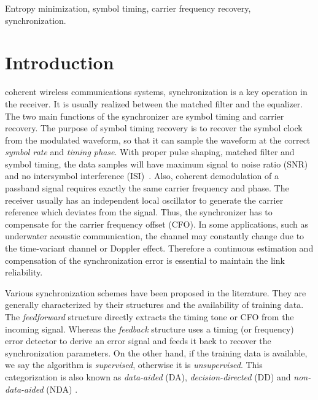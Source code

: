 \documentclass[journal,comsoc]{IEEEtran}
\begin{document}
\begin{IEEEkeywords}
Entropy minimization, symbol timing, carrier frequency recovery, synchronization.
\end{IEEEkeywords}

\IEEEpeerreviewmaketitle

\section{Introduction}
\label{sec:intro}
 coherent wireless communications systems, synchronization is a key operation in the receiver.
It is usually realized between the matched filter and the equalizer.
The two main functions of the synchronizer are symbol timing and carrier recovery.
The purpose of symbol timing recovery is to recover the symbol clock from the modulated waveform, so that it can sample the waveform at the correct \textit{symbol rate} and \textit{timing phase}.
With proper pulse shaping, matched filter and symbol timing, the data samples will have maximum signal to noise ratio (SNR) and no intersymbol interference (ISI)~\cite{mengali1997synchronization}.
Also, coherent demodulation of a passband signal requires exactly the same carrier frequency and phase. 
The receiver usually has an independent local oscillator to generate the carrier reference which deviates from the signal.  
Thus, the synchronizer has to compensate for the carrier frequency offset (CFO). 
In some applications, such as underwater acoustic communication, the channel may constantly change due to the time-variant channel or Doppler effect. 
Therefore a continuous estimation and compensation of the synchronization error is essential to maintain the link reliability.

Various synchronization schemes have been proposed in the literature.
They are generally characterized by their structures and the availability of training data.
The \textit{feedforward} structure directly extracts the timing tone or CFO  from the incoming signal.
Whereas the \textit{feedback} structure uses a timing (or frequency) error detector to derive an error signal and feeds it back to recover the synchronization parameters.
On the other hand, if the training data is available, we say the algorithm is \textit{supervised}, otherwise it is \textit{unsupervised}.
This categorization is also known as \textit{data-aided} (DA), \textit{decision-directed} (DD) and \textit{non-data-aided} (NDA) \cite{mengali1997synchronization}.
\end{document}
